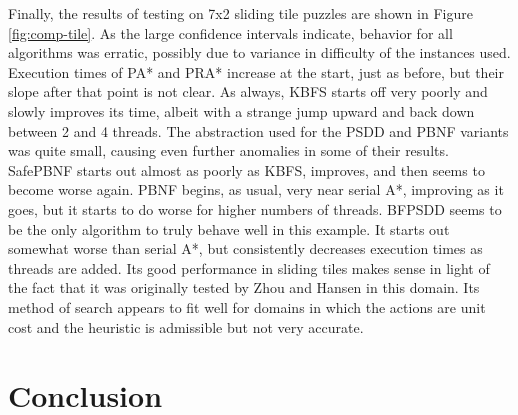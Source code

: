 \documentclass{article}
\begin{document}
Finally, the results of testing on 7x2 sliding tile puzzles are shown in Figure \ref{fig:comp-tile}. As the large confidence intervals indicate, behavior for all algorithms was erratic, possibly due to variance in difficulty of the instances used. Execution times of PA* and PRA* increase at the start, just as before, but their slope after that point is not clear. As always, KBFS starts off very poorly and slowly improves its time, albeit with a strange jump upward and back down between 2 and 4 threads. The abstraction used for the PSDD and PBNF variants was quite small, causing even further anomalies in some of their results. SafePBNF starts out almost as poorly as KBFS, improves, and then seems to become worse again. PBNF begins, as usual, very near serial A*, improving as it goes, but it starts to do worse for higher numbers of threads. BFPSDD seems to be the only algorithm to truly behave well in this example. It starts out somewhat worse than serial A*, but consistently decreases execution times as threads are added. Its good performance in sliding tiles makes sense in light of the fact that it was originally tested by Zhou and Hansen in this domain. Its method of search appears to fit well for domains in which the actions are unit cost and the heuristic is admissible but not very accurate.
\section{Conclusion}
\end{document}
